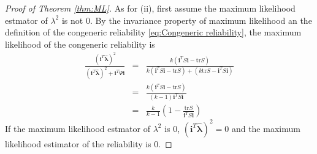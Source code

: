 \documentclass[twoside]{article}
\begin{document}
\begin{proof}[Proof of Theorem \ref{thm:ML}]
As for (ii), first assume the maximum likelihood estmator of $\lambda^{2}$
is not $0$. By the invariance property of maximum likelihood an the definition of the congeneric reliability \eqref{eq:Congeneric reliability}, the maximum likelihood of the congeneric reliability is
\begin{eqnarray*}
\frac{\left(\mathbf{i}^{T}\mathbf{\hat{\lambda}}\right)^{2}}{\left(\mathbf{i}^{T}\mathbf{\hat{\lambda}}\right)^{2}+\mathbf{i}^{T}\Psi\mathbf{i}} & = & \frac{k\left(\mathbf{i}^{T}S\mathbf{i}-\textrm{tr}S\right)}{k\left(\mathbf{i}^{T}S\mathbf{i}-\textrm{tr}S\right)+\left(k\textrm{tr}S-\mathbf{i}^{T}S\mathbf{i}\right)}\\
 & = & \frac{k\left(\mathbf{i}^{T}S\mathbf{i}-\textrm{tr}S\right)}{\left(k-1\right)\mathbf{i}^{T}S\mathbf{i}}\\
 & = & \frac{k}{k-1}\left(1-\frac{\textrm{tr}S}{\mathbf{i}^{T}S\mathbf{i}}\right)
\end{eqnarray*}
If the maximum likelihood estmator of $\lambda^{2}$ is $0$, $\left(\mathbf{i}^{T}\mathbf{\hat{\lambda}}\right)^{2}=0$
and the maximum likelihood estimator of the reliability is $0.$
\end{proof}
\end{document}
